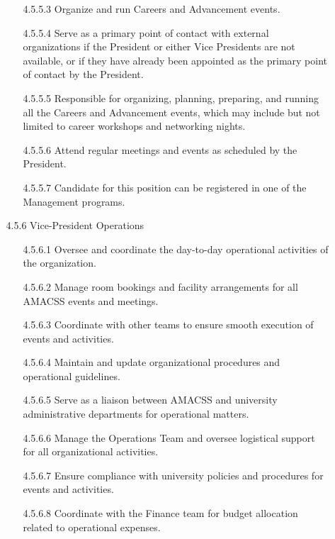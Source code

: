 \documentclass[12pt,a4paper]{article}
\begin{document}
\begin{enumerate}
\begin{enumerate}
\begin{enumerate}
\item[4.5.5.3] Organize and run Careers and Advancement events.

\item[4.5.5.4] Serve as a primary point of contact with external organizations if the President or either Vice Presidents are not available, or if they have already been appointed as the primary point of contact by the President.

\item[4.5.5.5] Responsible for organizing, planning, preparing, and running all the Careers and Advancement events, which may include but not limited to career workshops and networking nights.

\item[4.5.5.6] Attend regular meetings and events as scheduled by the President.

\item[4.5.5.7] Candidate for this position can be registered in one of the Management programs.
\end{enumerate}

\item[4.5.6] Vice-President Operations

\begin{enumerate}
\item[4.5.6.1] Oversee and coordinate the day-to-day operational activities of the organization.

\item[4.5.6.2] Manage room bookings and facility arrangements for all AMACSS events and meetings.

\item[4.5.6.3] Coordinate with other teams to ensure smooth execution of events and activities.

\item[4.5.6.4] Maintain and update organizational procedures and operational guidelines.

\item[4.5.6.5] Serve as a liaison between AMACSS and university administrative departments for operational matters.

\item[4.5.6.6] Manage the Operations Team and oversee logistical support for all organizational activities.

\item[4.5.6.7] Ensure compliance with university policies and procedures for events and activities.

\item[4.5.6.8] Coordinate with the Finance team for budget allocation related to operational expenses.
\end{enumerate}


\end{enumerate}
\end{enumerate}
\end{document}
